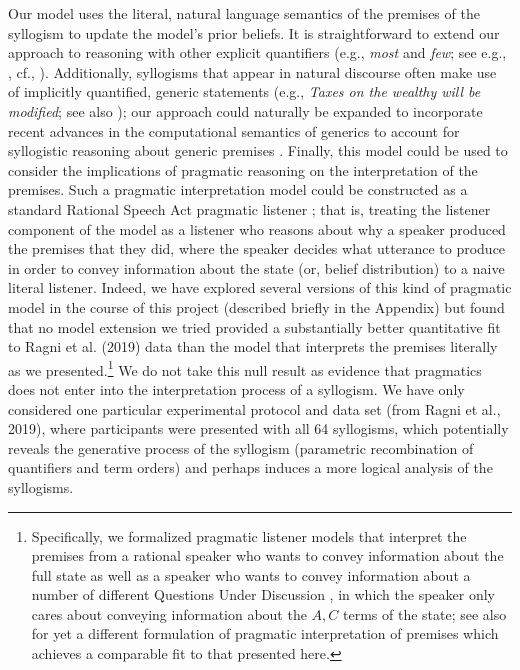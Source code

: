 \documentclass[floatsintext, doc]{apa6}
\begin{document}
Our model uses the literal, natural language semantics of the premises of the syllogism to update the model's prior beliefs. 
It is straightforward to extend our approach to reasoning with other explicit quantifiers (e.g., \emph{most} and \emph{few}; see e.g., , cf., ).
Additionally, syllogisms that appear in natural discourse often make use of implicitly quantified, generic statements (e.g., \emph{Taxes on the wealthy will be modified}; see also ); our approach could naturally be expanded to incorporate recent advances in the computational semantics of generics to account for syllogistic reasoning about generic premises \cite{tessler2019language}. 
Finally, this model could be used to consider the implications of pragmatic reasoning on the interpretation of the premises. 
Such a pragmatic interpretation model could be constructed as a standard Rational Speech Act pragmatic listener \cite{Frank2012a, goodman2016pragmatic, scontras2018probabilistic}; that is, treating the listener component of the model as a listener who reasons about why a speaker produced the premises that they did, where the speaker decides what utterance to produce in order to convey information about the state (or, belief distribution) to a naive literal listener.  %
Indeed, we have explored several versions of this kind of pragmatic model in the course of this project (described briefly in the Appendix) but found that no model extension we tried provided a substantially better quantitative fit to Ragni et al. (2019) data than the model that interprets the premises literally as we presented.\footnote{
Specifically, we formalized pragmatic listener models that interpret the premises from a rational speaker who wants to convey information about the full state as well as a speaker who wants to convey information about a number of different Questions Under Discussion \cite{Roberts2004QUD}, in which the speaker only cares about conveying information about the $A, C$ terms of the state; see also  for yet a different formulation of pragmatic interpretation of premises which achieves a comparable fit to that presented here.
}
We do not take this null result as evidence that pragmatics does not enter into the interpretation process of a syllogism.
We have only considered one particular experimental protocol and data set (from Ragni et al., 2019), where participants were presented with all 64 syllogisms, which potentially reveals the generative process of the syllogism (parametric recombination of quantifiers and term orders) and perhaps induces a more logical analysis of the syllogisms.
\end{document}
